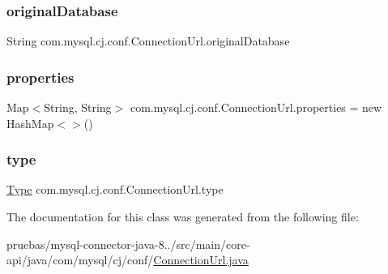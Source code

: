 \subsubsection{\texorpdfstring{original\+Database}{originalDatabase}}
{\footnotesize\ttfamily String com.\+mysql.\+cj.\+conf.\+Connection\+Url.\+original\+Database\hspace{0.3cm}{\ttfamily [protected]}}

\mbox{\label{classcom_1_1mysql_1_1cj_1_1conf_1_1_connection_url_afc53ba40da35bf161d2df6fbd785b09b}} 
\subsubsection{\texorpdfstring{properties}{properties}}
{\footnotesize\ttfamily Map$<$String, String$>$ com.\+mysql.\+cj.\+conf.\+Connection\+Url.\+properties = new Hash\+Map$<$$>$()\hspace{0.3cm}{\ttfamily [protected]}}

\mbox{\label{classcom_1_1mysql_1_1cj_1_1conf_1_1_connection_url_a7086957f46b62fc28263e76fb9159a3c}} 
\subsubsection{\texorpdfstring{type}{type}}
{\footnotesize\ttfamily \mbox{\hyperlink{enumcom_1_1mysql_1_1cj_1_1conf_1_1_connection_url_1_1_type}{Type}} com.\+mysql.\+cj.\+conf.\+Connection\+Url.\+type\hspace{0.3cm}{\ttfamily [protected]}}



The documentation for this class was generated from the following file\+:\begin{DoxyCompactItemize}
\item 
pruebas/mysql-\/connector-\/java-\/8../src/main/core-\/api/java/com/mysql/cj/conf/\mbox{\hyperlink{_connection_url_8java}{Connection\+Url.\+java}}\end{DoxyCompactItemize}
